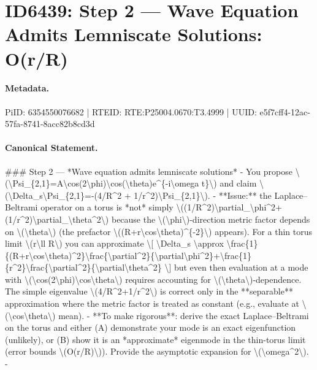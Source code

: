 \section*{ID6439: Step 2 — Wave Equation Admits Lemniscate Solutions: O(r/R)}
\paragraph{Metadata.}
PiID: 6354550076682 | RTEID: RTE:P25004.0670:T3.4999 | UUID: e5f7cff4-12ac-57fa-8741-8acc82b8cd3d

\paragraph{Canonical Statement.}
\#\#\# Step 2 — *Wave equation admits lemniscate solutions* - You propose \textbackslash{}(\textbackslash{}Psi\_\{2,1\}=A\textbackslash{}cos(2\textbackslash{}phi)\textbackslash{}cos(\textbackslash{}theta)e\textasciicircum{}\{-i\textbackslash{}omega t\}\textbackslash{}) and claim \textbackslash{}(\textbackslash{}Delta\_s\textbackslash{}Psi\_\{2,1\}=-(4/R\textasciicircum{}2 + 1/r\textasciicircum{}2)\textbackslash{}Psi\_\{2,1\}\textbackslash{}). - **Issue:** the Laplace–Beltrami operator on a torus is *not* simply \textbackslash{}((1/R\textasciicircum{}2)\textbackslash{}partial\_\textbackslash{}phi\textasciicircum{}2+(1/r\textasciicircum{}2)\textbackslash{}partial\_\textbackslash{}theta\textasciicircum{}2\textbackslash{}) because the \textbackslash{}(\textbackslash{}phi\textbackslash{})-direction metric factor depends on \textbackslash{}(\textbackslash{}theta\textbackslash{}) (the prefactor \textbackslash{}((R+r\textbackslash{}cos\textbackslash{}theta)\textasciicircum{}\{-2\}\textbackslash{}) appears). For a thin torus limit \textbackslash{}(r\textbackslash{}ll R\textbackslash{}) you can approximate \textbackslash{}[ \textbackslash{}Delta\_s \textbackslash{}approx \textbackslash{}frac\{1\}\{(R+r\textbackslash{}cos\textbackslash{}theta)\textasciicircum{}2\}\textbackslash{}frac\{\textbackslash{}partial\textasciicircum{}2\}\{\textbackslash{}partial\textbackslash{}phi\textasciicircum{}2\}+\textbackslash{}frac\{1\}\{r\textasciicircum{}2\}\textbackslash{}frac\{\textbackslash{}partial\textasciicircum{}2\}\{\textbackslash{}partial\textbackslash{}theta\textasciicircum{}2\} \textbackslash{}] but even then evaluation at a mode with \textbackslash{}(\textbackslash{}cos(2\textbackslash{}phi)\textbackslash{}cos\textbackslash{}theta\textbackslash{}) requires accounting for \textbackslash{}(\textbackslash{}theta\textbackslash{})-dependence. The simple eigenvalue \textbackslash{}(4/R\textasciicircum{}2+1/r\textasciicircum{}2\textbackslash{}) is correct only in the **separable** approximation where the metric factor is treated as constant (e.g., evaluate at \textbackslash{}(\textbackslash{}cos\textbackslash{}theta\textbackslash{}) mean). - **To make rigorous**: derive the exact Laplace–Beltrami on the torus and either (A) demonstrate your mode is an exact eigenfunction (unlikely), or (B) show it is an *approximate* eigenmode in the thin-torus limit (error bounds \textbackslash{}(O(r/R)\textbackslash{})). Provide the asymptotic expansion for \textbackslash{}(\textbackslash{}omega\textasciicircum{}2\textbackslash{}). - 